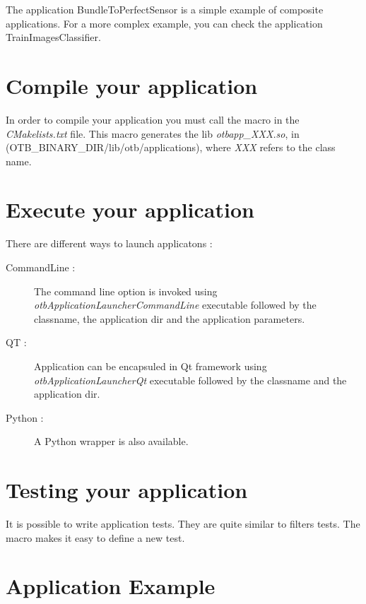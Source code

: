 The application BundleToPerfectSensor is a simple example of composite applications.
For a more complex example, you can check the application TrainImagesClassifier.

\section{Compile your application}

In order to compile your application you must call the macro  in the \emph{CMakelists.txt} file. 
This macro generates the lib \emph{otbapp\_XXX.so}, in (OTB\_BINARY\_DIR/lib/otb/applications), where \emph{XXX} refers to the class name.

\section{Execute your application}

There are different ways to launch applicatons :

\begin{description}
\item[CommandLine :] The command line option is invoked using \emph{otbApplicationLauncherCommandLine} executable followed by the classname, the application dir and the application parameters.
\item[QT :] Application can be encapsuled in Qt framework using \emph{otbApplicationLauncherQt} executable followed by the classname and the application dir.
\item[Python :] A Python wrapper is also available.
\end{description}


\section{Testing your application}
\label{sec:appTesting}
It is possible to write application tests. They are quite similar to filters tests.
The macro  makes it easy to define a new test.


\section{Application Example}
\label{sec:ApplicationExample}
\ifitkFullVersion

\fi

